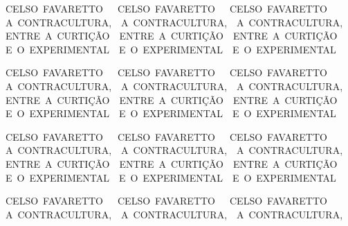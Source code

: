 {{\noindent\mbox{\noindent\hspace*{-180pt}CELSO FAVARETTO \mbox{  }\mbox{  }CELSO FAVARETTO \mbox{  }\mbox{  }CELSO FAVARETTO\\}
\mbox{\hspace*{-180pt}A CONTRACULTURA, \mbox{  }A CONTRACULTURA, \mbox{  }A CONTRACULTURA,\\}
\mbox{\hspace*{-180pt}ENTRE A CURTIÇÃO \mbox{  }ENTRE A CURTIÇÃO \mbox{  }ENTRE A CURTIÇÃO\\}
\mbox{\hspace*{-180pt}E O EXPERIMENTAL \mbox{  }E O EXPERIMENTAL \mbox{  }E O EXPERIMENTAL}

\noindent\mbox{\noindent\hspace*{-38pt}CELSO FAVARETTO \mbox{  }\mbox{  }CELSO FAVARETTO \mbox{  }\mbox{  }CELSO FAVARETTO\\}
\mbox{\hspace*{-38pt}A CONTRACULTURA, \mbox{  }A CONTRACULTURA, \mbox{  }A CONTRACULTURA,\\}
\mbox{\hspace*{-38pt}ENTRE A CURTIÇÃO \mbox{  }ENTRE A CURTIÇÃO \mbox{  }ENTRE A CURTIÇÃO\\}
\mbox{\hspace*{-38pt}E O EXPERIMENTAL \mbox{  }E O EXPERIMENTAL \mbox{  }E O EXPERIMENTAL}

\noindent\mbox{\noindent\hspace*{-140pt}CELSO FAVARETTO \mbox{  }\mbox{  }CELSO FAVARETTO \mbox{  }\mbox{  }CELSO FAVARETTO\\} \enlargethispage{\textheight}
\mbox{\hspace*{-140pt}A CONTRACULTURA, \mbox{  }A CONTRACULTURA, \mbox{  }A CONTRACULTURA,\\}
\mbox{\hspace*{-140pt}ENTRE A CURTIÇÃO \mbox{  }ENTRE A CURTIÇÃO \mbox{  }ENTRE A CURTIÇÃO\\}
\mbox{\hspace*{-140pt}E O EXPERIMENTAL \mbox{  }E O EXPERIMENTAL \mbox{  }E O EXPERIMENTAL}

\noindent\mbox{\noindent\hspace*{-160pt}CELSO FAVARETTO \mbox{  }\mbox{  }CELSO FAVARETTO \mbox{  }\mbox{  }CELSO FAVARETTO\\} 
\mbox{\hspace*{-160pt}A CONTRACULTURA, \mbox{  }A CONTRACULTURA, \mbox{  }A CONTRACULTURA,}
}}


